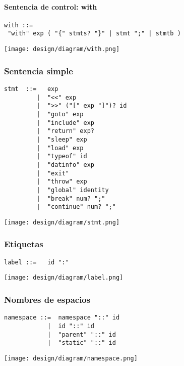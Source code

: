\paragraph{Sentencia de control: with}
\begin{multicols}{2}
\begin{lstlisting}[style=nonumbers,basicstyle=\tiny]
with ::= 
 "with" exp ( "{" stmts? "}" | stmt ";" | stmtb )
\end{lstlisting}  	
\columnbreak
\begin{center}
\texttt{[image: design/diagram/with.png]} 
\end{center}
\end{multicols}


\subsubsection{Sentencia simple}
\begin{multicols}{2}
\begin{lstlisting}[style=nonumbers]
stmt  ::=   exp
         |  "<<" exp
         |  ">>" ("[" exp "]")? id
         |  "goto" exp
         |  "include" exp
         |  "return" exp?
         |  "sleep" exp 
         |  "load" exp 
         |  "typeof" id 
         |  "datinfo" exp
         |  "exit"
         |  "throw" exp
         |  "global" identity
         |  "break" num? ";"
         |  "continue" num? ";"
\end{lstlisting}  	
\columnbreak
\begin{center}
\texttt{[image: design/diagram/stmt.png]} 
\end{center}
\end{multicols}

\subsubsection{Etiquetas}
\begin{multicols}{2}
\begin{lstlisting}[style=nonumbers]
label ::=   id ":"
\end{lstlisting}  	
\columnbreak
\begin{center}
\texttt{[image: design/diagram/label.png]} 
\end{center}
\end{multicols}
\pagebreak
\subsubsection{Nombres de espacios}
\begin{multicols}{2}
\begin{lstlisting}[style=nonumbers, basicstyle=\tiny]      
namespace ::=  namespace "::" id
            |  id "::" id
            |  "parent" "::" id
            |  "static" "::" id
\end{lstlisting}  
\columnbreak	
\begin{center}
\texttt{[image: design/diagram/namespace.png]} 
\end{center}
\end{multicols}
